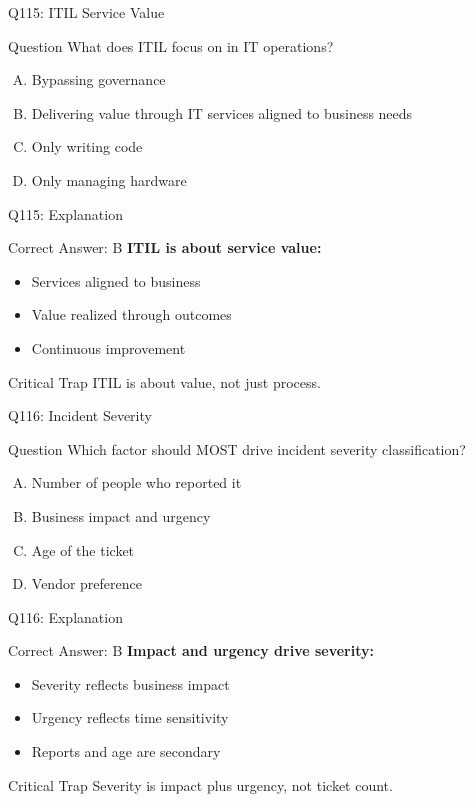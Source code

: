 \documentclass{beamer}
\begin{document}
	\begin{frame}{Q115: ITIL Service Value}
		\begin{block}{Question}
			What does ITIL focus on in IT operations?
		\end{block}
		\begin{enumerate}[(A)]
			\item Bypassing governance
			\item Delivering value through IT services aligned to business needs
			\item Only writing code
			\item Only managing hardware
		\end{enumerate}
	\end{frame}
	
	\begin{frame}{Q115: Explanation}
		\begin{block}{Correct Answer: B}
			\textbf{ITIL is about service value:}
			\begin{itemize}
				\item Services aligned to business
				\item Value realized through outcomes
				\item Continuous improvement
			\end{itemize}
		\end{block}
		\begin{alertblock}{Critical Trap}
			ITIL is about value, not just process.
		\end{alertblock}
	\end{frame}
	
	\begin{frame}{Q116: Incident Severity}
		\begin{block}{Question}
			Which factor should MOST drive incident severity classification?
		\end{block}
		\begin{enumerate}[(A)]
			\item Number of people who reported it
			\item Business impact and urgency
			\item Age of the ticket
			\item Vendor preference
		\end{enumerate}
	\end{frame}
	
	\begin{frame}{Q116: Explanation}
		\begin{block}{Correct Answer: B}
			\textbf{Impact and urgency drive severity:}
			\begin{itemize}
				\item Severity reflects business impact
				\item Urgency reflects time sensitivity
				\item Reports and age are secondary
			\end{itemize}
		\end{block}
		\begin{alertblock}{Critical Trap}
			Severity is impact plus urgency, not ticket count.
		\end{alertblock}
	\end{frame}
	
\end{document}

